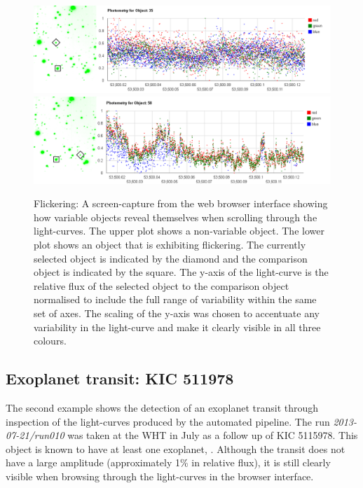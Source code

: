\begin{figure}
\centering
\includegraphics[width=150mm]{images/gumus-comparison-lc.png}
\includegraphics[width=150mm]{images/gumus-discovery-lc.png}
\caption{Flickering: A screen-capture from the web browser interface showing how variable objects reveal themselves when scrolling through the light-curves. The upper plot shows a non-variable object. The lower plot shows an object that is exhibiting flickering.  The currently selected object is indicated by the diamond and the comparison object is indicated by the square. The y-axis of the light-curve is the relative flux of the selected object to the comparison object normalised to include the full range of variability within the same set of axes. The scaling of the y-axis was chosen to accentuate any variability in the light-curve and make it clearly visible in all three colours.}
\label{fig:gumus-discovery}
\end{figure}

\subsection{Exoplanet transit: KIC 511978}
The second example shows the detection of an exoplanet transit through inspection of the light-curves produced by the automated pipeline. The run \emph{2013-07-21/run010} was taken at the WHT in July as a follow up of KIC 5115978. This object is known to have at least one exoplanet, \citep{KIC5115978}. Although the transit does not have a large amplitude (approximately 1\% in relative flux), it is still clearly visible when browsing through the light-curves in the browser interface. 


